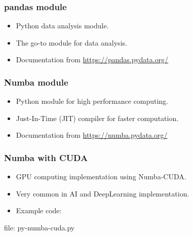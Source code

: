 
\begin{frame}[fragile]
\frametitle{pandas module}

\begin{itemize}
\item Python data analysis module.
\item The go-to module for data analysis.
\item Documentation from \url{https://pandas.pydata.org/}
\end{itemize}

%

\end{frame}


\begin{frame}[fragile]
\frametitle{Numba module}

\begin{itemize}
\item Python module for high performance computing.
\item Just-In-Time (JIT) compiler for faster computation.
\item Documentation from \url{https://numba.pydata.org/}
\end{itemize}

%

\end{frame}


\begin{frame}[fragile]
\frametitle{Numba with CUDA}

\begin{itemize}
\item GPU computing implementation using Numba-CUDA.
\item Very common in AI and DeepLearning implementation.
\item Example code:
\end{itemize}

\newcommand{\newfilename}{py-numba-cuda.py}

file: \newfilename

\end{frame}

